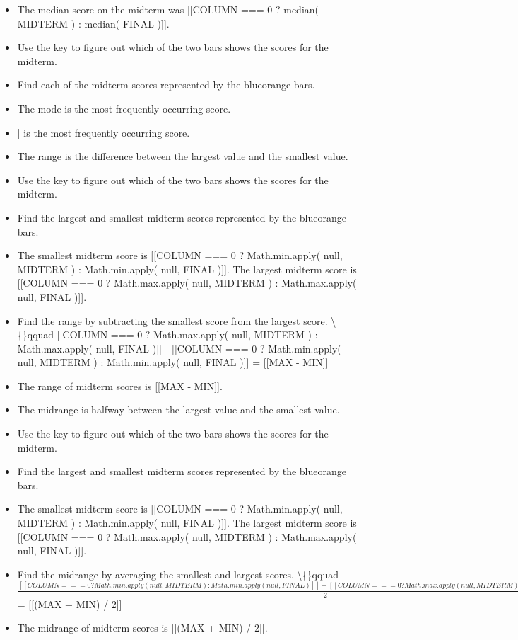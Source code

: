 \documentclass{article}
\begin{document}
\begin{itemize}
                            
                                $\frac{
                                [[COLUMN === 0 ? sortNumbers( MIDTERM )[ NUM_STUDENTS / 2 - 1 ] : sortNumbers( FINAL )[ NUM_STUDENTS / 2 - 1 ]]] +
                                [[COLUMN === 0 ? sortNumbers( MIDTERM )[ NUM_STUDENTS / 2 ] : sortNumbers( FINAL )[ NUM_STUDENTS / 2 ]]]
                                }{2}$ = [[COLUMN === 0 ? median( MIDTERM ) : median( FINAL )]]
  \item The median score on the midterm was [[COLUMN === 0 ? median( MIDTERM ) : median( FINAL )]].
  \item Use the key to figure out which of the two bars shows the scores for the midterm.
  \item Find each of the midterm scores represented by the blueorange bars.
  \item The mode is the most frequently occurring score.
  \item [[COLUMN === 0 ? mode( MIDTERM ) : mode( FINAL )]] is the most frequently occurring score.
  \item The range is the difference between the largest value and the smallest value.
  \item Use the key to figure out which of the two bars shows the scores for the midterm.
  \item Find the largest and smallest midterm scores represented by the blueorange bars.
  \item The smallest midterm score is [[COLUMN === 0 ? Math.min.apply( null, MIDTERM ) : Math.min.apply( null, FINAL )]]. The largest midterm score is [[COLUMN === 0 ? Math.max.apply( null, MIDTERM ) : Math.max.apply( null, FINAL )]].
  \item Find the range by subtracting the smallest score from the largest score.
                        \textbackslash\{\}qquad [[COLUMN === 0 ? Math.max.apply( null, MIDTERM ) : Math.max.apply( null, FINAL )]] - [[COLUMN === 0 ? Math.min.apply( null, MIDTERM ) : Math.min.apply( null, FINAL )]] = [[MAX - MIN]]
  \item The range of midterm scores is [[MAX - MIN]].
  \item The midrange is halfway between the largest value and the smallest value.
  \item Use the key to figure out which of the two bars shows the scores for the midterm.
  \item Find the largest and smallest midterm scores represented by the blueorange bars.
  \item The smallest midterm score is [[COLUMN === 0 ? Math.min.apply( null, MIDTERM ) : Math.min.apply( null, FINAL )]]. The largest midterm score is [[COLUMN === 0 ? Math.max.apply( null, MIDTERM ) : Math.max.apply( null, FINAL )]].
  \item Find the midrange by averaging the smallest and largest scores.
                        \textbackslash\{\}qquad $\frac{[[COLUMN === 0 ? Math.min.apply( null, MIDTERM ) : Math.min.apply( null, FINAL )]] + [[COLUMN === 0 ? Math.max.apply( null, MIDTERM ) : Math.max.apply( null, FINAL )]]}{2}$ = [[(MAX + MIN) / 2]]
  \item The midrange of midterm scores is [[(MAX + MIN) / 2]].
\end{itemize}
\end{document}
